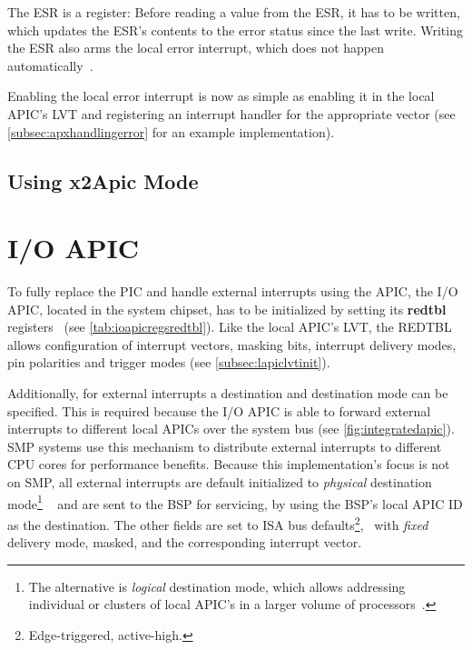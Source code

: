 The ESR is a  register: Before reading a value from the ESR, it has to be written, which updates the ESR's contents to the error status since the last write.
Writing the ESR also arms the local error interrupt, which does not happen automatically~\autocite[sec.~3.11.5.3]{ia32}.

Enabling the local error interrupt is now as simple as enabling it in the local APIC's LVT and registering an interrupt handler for the appropriate vector (see \autoref{subsec:apxhandlingerror} for an example implementation).

\subsection{Using x2Apic Mode}
\label{subsec:usingx2apic}


\section{I/O APIC}
\label{sec:ioapicinit}

To fully replace the PIC and handle external interrupts using the APIC, the I/O APIC, located in the system chipset, has to be initialized by setting its \textbf{\gls{redtbl}} registers~\autocite[sec.~9.5.8]{ich5} (see \autoref{tab:ioapicregsredtbl}).
Like the local APIC's LVT, the REDTBL allows configuration of interrupt vectors, masking bits, interrupt delivery modes, pin polarities and trigger modes (see \autoref{subsec:lapiclvtinit}).

Additionally, for external interrupts a destination and destination mode can be specified.
This is required because the I/O APIC is able to forward external interrupts to different local APICs over the system bus (see \autoref{fig:integratedapic}).
SMP systems use this mechanism to distribute external interrupts to different CPU cores for performance benefits.
Because this implementation's focus is not on SMP, all external interrupts are default initialized to \textit{physical} destination mode\footnote{
  The alternative is \textit{logical} destination mode, which allows addressing individual or clusters of local APIC's in a larger volume of processors~\autocite[sec.~3.11.6.2.2]{ia32}.}
~\autocite[sec.~3.11.6.2.1]{ia32} and are sent to the BSP for servicing, by using the BSP's local APIC ID as the destination.
The other fields are set to ISA bus defaults\footnote{
  Edge-triggered, active-high.},
\ with \textit{fixed} delivery mode, masked, and the corresponding interrupt vector.

